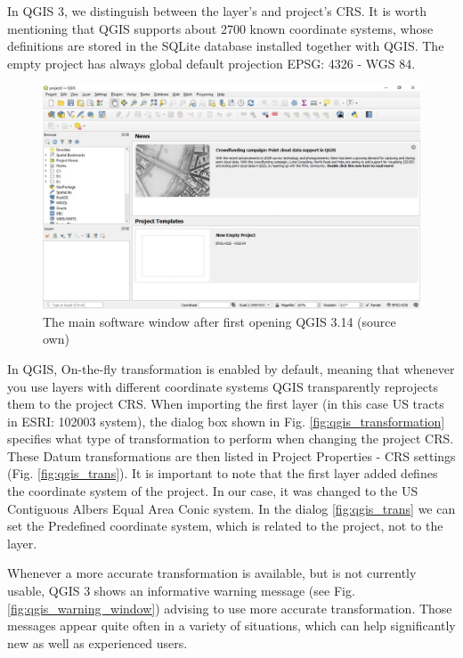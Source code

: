 \documentclass[a4paper,10pt,twoside]{article}
\begin{document}
In QGIS 3, we distinguish between the layer's and project's CRS. It is worth mentioning that QGIS supports about 2700 known coordinate systems, whose definitions are stored in the SQLite database installed together with QGIS. The empty project has always global default projection EPSG: 4326 - WGS 84.

\vspace{0.3cm}
\begin{figure}[hbt!] 
\begin{center}
\includegraphics[width=15cm]{../pictures/qgis_first_window.JPG} 
\caption[The main software window after first opening QGIS 3.14 (source own)]{The main software window after first opening QGIS 3.14 (source own)}
\label{fig:qgis_first_window}
\end{center}
\end{figure}

\noindent In QGIS, On-the-fly transformation is enabled by default, meaning that whenever you use layers with different coordinate systems QGIS transparently reprojects them to the project CRS. When importing the first layer (in this case US tracts in ESRI: 102003 system), the dialog box shown in Fig. \ref{fig:qgis_transformation} specifies what type of transformation to perform when changing the project CRS. These Datum transformations are then listed in Project Properties - CRS settings (Fig. \ref{fig:qgis_trans}). It is important to note that the first layer added defines the coordinate system of the project. In our case, it was changed to the US Contiguous Albers Equal Area Conic system. In the dialog \ref{fig:qgis_trans} we can set the Predefined coordinate system, which is related to the project, not to the layer.

Whenever a more accurate transformation is available, but is not currently usable, QGIS 3 shows an informative warning message (see Fig. \ref{fig:qgis_warning_window}) advising to use more accurate transformation. Those messages appear quite often in a variety of situations, which can help significantly new as well as experienced users.
\end{document}

